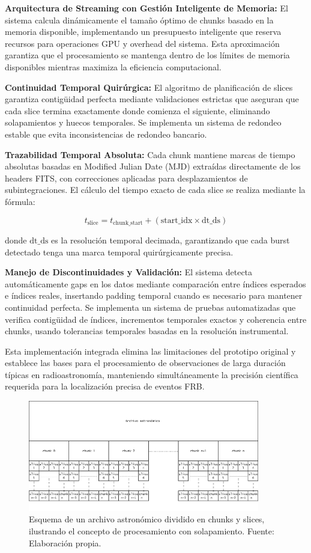 \textbf{Arquitectura de Streaming con Gestión Inteligente de Memoria:} El sistema calcula dinámicamente el tamaño óptimo de chunks basado en la memoria disponible, implementando un presupuesto inteligente que reserva recursos para operaciones GPU y overhead del sistema. Esta aproximación garantiza que el procesamiento se mantenga dentro de los límites de memoria disponibles mientras maximiza la eficiencia computacional.

\textbf{Continuidad Temporal Quirúrgica:} El algoritmo de planificación de slices garantiza contigüidad perfecta mediante validaciones estrictas que aseguran que cada slice termina exactamente donde comienza el siguiente, eliminando solapamientos y huecos temporales. Se implementa un sistema de redondeo estable que evita inconsistencias de redondeo bancario.

\textbf{Trazabilidad Temporal Absoluta:} Cada chunk mantiene marcas de tiempo absolutas basadas en Modified Julian Date (MJD) extraídas directamente de los headers FITS, con correcciones aplicadas para desplazamientos de subintegraciones. El cálculo del tiempo exacto de cada slice se realiza mediante la fórmula:

\[
t_{\text{slice}} = t_{\text{chunk\_start}} + (\text{start\_idx} \times \text{dt\_ds})
\]

donde $\text{dt\_ds}$ es la resolución temporal decimada, garantizando que cada burst detectado tenga una marca temporal quirúrgicamente precisa.

\textbf{Manejo de Discontinuidades y Validación:} El sistema detecta automáticamente gaps en los datos mediante comparación entre índices esperados e índices reales, insertando padding temporal cuando es necesario para mantener continuidad perfecta. Se implementa un sistema de pruebas automatizadas que verifica contigüidad de índices, incrementos temporales exactos y coherencia entre chunks, usando tolerancias temporales basadas en la resolución instrumental.

Esta implementación integrada elimina las limitaciones del prototipo original y establece las bases para el procesamiento de observaciones de larga duración típicas en radioastronomía, manteniendo simultáneamente la precisión científica requerida para la localización precisa de eventos FRB.

\begin{figure}[H]
\centering
\includegraphics[width=0.9\textwidth]{figures/sistema-chunks.png}
\caption{Esquema de un archivo astronómico dividido en chunks y slices, ilustrando el concepto de procesamiento con solapamiento. Fuente: Elaboración propia.}
\label{fig:sistema-chunks}
\end{figure}

